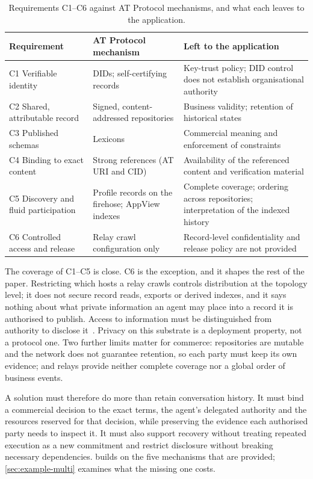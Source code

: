 \begin{table}[htbp]
\centering
\small
\caption{Requirements C1--C6 against AT Protocol mechanisms, and what each leaves to the application.}
\label{tab:atproto-coordination}
\begin{tabularx}{\textwidth}{@{}P{3.2cm}LL@{}}
\toprule
Requirement & AT Protocol mechanism & Left to the application \\
\midrule
C1 Verifiable identity & DIDs; self-certifying records & Key-trust policy; DID control does not establish organisational authority \\
C2 Shared, attributable record & Signed, content-addressed repositories & Business validity; retention of historical states \\
C3 Published schemas & Lexicons & Commercial meaning and enforcement of constraints \\
C4 Binding to exact content & Strong references (AT URI and CID) & Availability of the referenced content and verification material \\
C5 Discovery and fluid participation & Profile records on the firehose; AppView indexes & Complete coverage; ordering across repositories; interpretation of the indexed history \\
C6 Controlled access and release & Relay crawl configuration only & Record-level confidentiality and release policy are not provided~\citep{atproto2024roadmap} \\
\bottomrule
\end{tabularx}
\end{table}

The coverage of C1--C5 is close. C6 is the exception, and it shapes the rest of the paper. Restricting which hosts a relay crawls controls distribution at the topology level; it does not secure record reads, exports or derived indexes, and it says nothing about what private information an agent may place into a record it is authorised to publish. Access to information must be distinguished from authority to disclose it~\citep{myers1997,robustdecl}. Privacy on this substrate is a deployment property, not a protocol one. Two further limits matter for commerce: repositories are mutable and the network does not guarantee retention, so each party must keep its own evidence; and relays provide neither complete coverage nor a global order of business events.

A solution must therefore do more than retain conversation history. It must bind a commercial decision to the exact terms, the agent's delegated authority and the resources reserved for that decision, while preserving the evidence each authorised party needs to inspect it. It must also support recovery without treating repeated execution as a new commitment and restrict disclosure without breaking necessary dependencies.  builds on the five mechanisms that are provided; \cref{sec:example-multi} examines what the missing one costs.
